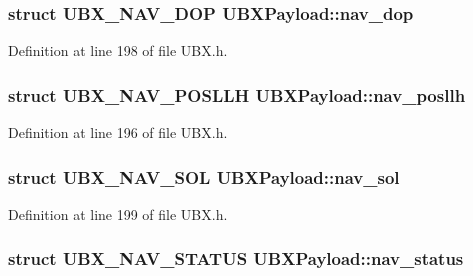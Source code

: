 \hypertarget{group___g_s_p_module_gaabf42aafbe0f26fe6224cd255ddfcbd3}{
\subsubsection[{nav\-\_\-dop}]{\setlength{\rightskip}{0pt plus 5cm}struct {\bf U\-B\-X\-\_\-\-N\-A\-V\-\_\-\-D\-O\-P} U\-B\-X\-Payload\-::nav\-\_\-dop}}\label{group___g_s_p_module_gaabf42aafbe0f26fe6224cd255ddfcbd3}


Definition at line 198 of file U\-B\-X.\-h.

\hypertarget{group___g_s_p_module_gac43eeda1b5ade727f5856e57ae8d4fdb}{
\subsubsection[{nav\-\_\-posllh}]{\setlength{\rightskip}{0pt plus 5cm}struct {\bf U\-B\-X\-\_\-\-N\-A\-V\-\_\-\-P\-O\-S\-L\-L\-H} U\-B\-X\-Payload\-::nav\-\_\-posllh}}\label{group___g_s_p_module_gac43eeda1b5ade727f5856e57ae8d4fdb}


Definition at line 196 of file U\-B\-X.\-h.

\hypertarget{group___g_s_p_module_gaba19134cfa2bf927f5ae568a4d1fa82f}{
\subsubsection[{nav\-\_\-sol}]{\setlength{\rightskip}{0pt plus 5cm}struct {\bf U\-B\-X\-\_\-\-N\-A\-V\-\_\-\-S\-O\-L} U\-B\-X\-Payload\-::nav\-\_\-sol}}\label{group___g_s_p_module_gaba19134cfa2bf927f5ae568a4d1fa82f}


Definition at line 199 of file U\-B\-X.\-h.

\hypertarget{group___g_s_p_module_ga10f246cbf1341ebaca17da26a61eb344}{
\subsubsection[{nav\-\_\-status}]{\setlength{\rightskip}{0pt plus 5cm}struct {\bf U\-B\-X\-\_\-\-N\-A\-V\-\_\-\-S\-T\-A\-T\-U\-S} U\-B\-X\-Payload\-::nav\-\_\-status}}\label{group___g_s_p_module_ga10f246cbf1341ebaca17da26a61eb344}


